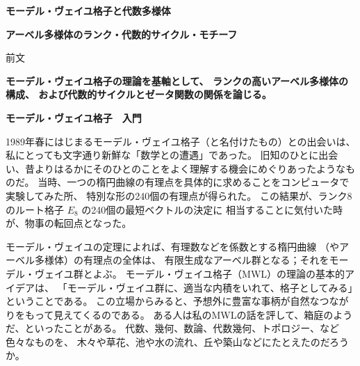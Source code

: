 \documentclass[uplatex,dvipdfmx]{jlreq}
\begin{document}
\begin{center}
  \vspace*{20pt}
  {\Huge\bfseries モーデル・ヴェイユ格子と代数多様体}

  \vspace{30pt}

  {\Large\bfseries アーベル多様体のランク・代数的サイクル・モチーフ}

  \vspace{50pt}

  {\large 前文}

  \vspace{10pt}

  \parbox{0.85\textwidth}{
    \large\bfseries
    モーデル・ヴェイユ格子の理論を基軸として、
    ランクの高いアーベル多様体の構成、
    および代数的サイクルとゼータ関数の関係を論じる。
  }
\end{center}

\vfill

\newpage

\begin{center}
{\large\bfseries モーデル・ヴェイユ格子　入門}

\hspace*{\fill}{\large\bfseries 塩田 徹治（立教大学・理）}
\end{center}

\bigskip\bigskip

1989年春にはじまるモーデル・ヴェイユ格子（と名付けたもの）との出会いは、
私にとっても文字通り新鮮な「数学との遭遇」であった。
旧知のひとに出会い、昔よりはるかにそのひとのことをよく理解する機会にめぐりあったようなものだ。
当時、一つの楕円曲線の有理点を具体的に求めることをコンピュータで実験してみた所、
特別な形の240個の有理点が得られた。
この結果が、ランク8のルート格子 $E_8$ の240個の最短ベクトルの決定に
相当することに気付いた時が、物事の転回点となった。

\bigskip

モーデル・ヴェイユの定理によれば、有理数などを係数とする楕円曲線
（やアーベル多様体）の有理点の全体は、
有限生成なアーベル群となる；それをモーデル・ヴェイユ群とよぶ。
モーデル・ヴェイユ格子（MWL）の理論の基本的アイデアは、
「モーデル・ヴェイユ群に、適当な内積をいれて、格子としてみる」ということである。
この立場からみると、予想外に豊富な事柄が自然なつながりをもって見えてくるのである。
ある人は私のMWLの話を評して、箱庭のようだ、といったことがある。
代数、幾何、数論、代数幾何、トポロジー、など色々なものを、
木々や草花、池や水の流れ、丘や築山などにたとえたのだろうか。
\end{document}
